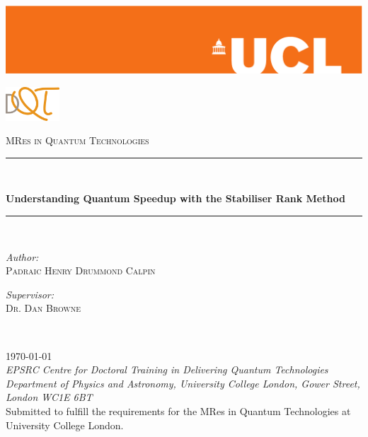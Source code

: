 \newcommand{\HRule}{\rule{\linewidth}{0.5mm}}
\begin{titlepage}
\hspace*{-2.5cm}\includegraphics[width=1.2\hsize]{Figures/orange-eps-converted-to}
\\[3cm]
\begin{flushright}
	\includegraphics[width=0.15\textwidth]{Figures/DQT-LOGO.png}
\end{flushright}
\vspace{-15pt}
\textsc{\large MRes in Quantum Technologies}
\\[1cm]
\HRule \\[0.5cm]
\begin{center}
	\textsf{\huge \bfseries Understanding Quantum Speedup with the Stabiliser Rank Method} \\
\end{center}
\HRule \\[1cm]
\begin{minipage}{0.5\textwidth}
	\begin{flushleft}
		\emph{Author:} \\
		\textsc{Padraic Henry Drummond Calpin} \\[0.4cm]	
	\end{flushleft}
\end{minipage}
\begin{minipage}{0.5\textwidth}
	\begin{flushright}
		\emph{Supervisor:} \\
		\textsc{Dr. Dan Browne} \\[0.4cm]
	\end{flushright}
\end{minipage} \\[1cm]
\begin{center}
	\large \today\\[0.5cm]
	\emph{EPSRC Centre for Doctoral Training in Delivering Quantum Technologies\\ Department of Physics and Astronomy, University College London, Gower Street, London WC1E 6BT}
	\\[2.5cm]
	Submitted to fulfill the requirements for the MRes in Quantum Technologies at University College London.
\end{center}
\end{titlepage}